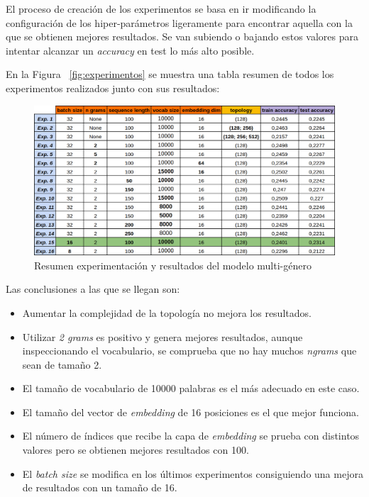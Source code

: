 \documentclass[12pt,a4paper, xcolor=table]{article}
\begin{document}
\vspace{2mm}

El proceso de creación de los experimentos se basa en ir modificando la configuración de los hiper-parámetros ligeramente para encontrar aquella con la que se obtienen mejores resultados. Se van subiendo o bajando estos valores para intentar alcanzar un \textit{accuracy} en test lo más alto posible.

\vspace{1mm}

En la Figura ~\ref{fig:experimentos} se muestra una tabla resumen de todos los experimentos realizados junto con sus resultados:


\begin{figure}[!h]
    \centering
    \includegraphics[width=500px]{img/multi.png}
    \caption{Resumen experimentación y resultados del modelo multi-género}
    \label{fig:experimentos2}
\end{figure}

Las conclusiones a las que se llegan son:

\begin{itemize}
  \item Aumentar la complejidad de la topología no mejora los resultados.
  \item Utilizar \textit{2 grams} es positivo y genera mejores resultados, aunque inspeccionando el vocabulario, se comprueba que no hay muchos \textit{ngrams} que sean de tamaño 2.
  \item El tamaño de vocabulario de 10000 palabras es el más adecuado en este caso.
  \item El tamaño del vector de \textit{embedding} de 16 posiciones es el que mejor funciona.
  \item El número de índices que recibe la capa de \textit{embedding} se prueba con distintos valores pero se obtienen mejores resultados con 100.
  \item El \textit{batch size} se modifica en los últimos experimentos consiguiendo una mejora de resultados con un tamaño de 16.
\end{itemize}
\end{document}
